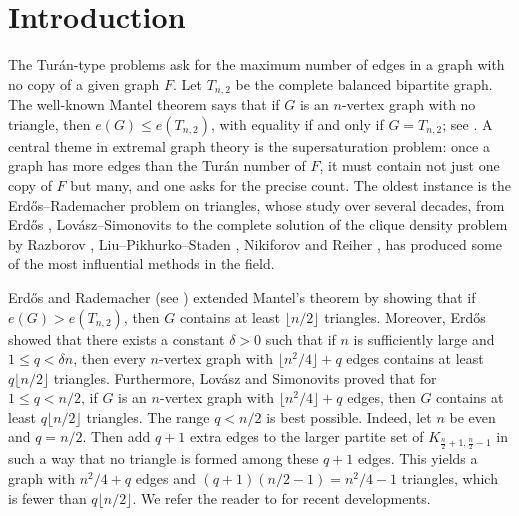 \documentclass[11pt,a4paper]{article}
\theoremstyle{definition}
\theoremstyle{plain}
\renewcommand{\le}{\leqslant}
\begin{document}
\section{Introduction}


The Tur\'an-type problems ask for the maximum number of edges in a graph with no copy of a given graph $F$. 
 Let $T_{n,2}$ be the complete balanced bipartite graph.  
The well-known Mantel theorem says that if $G$ is an $n$-vertex graph with no triangle, then $e(G)\le e(T_{n,2})$, with equality if and only if $G=T_{n,2}$; see \cite{Bollobas78}.   
A central theme in extremal graph theory is the
supersaturation problem: once a graph has more edges than
the Tur\'an number of $F$, it must contain not just
one copy of $F$ but many, and one asks for the
precise count. The oldest instance is the
Erd\H{o}s--Rademacher problem on triangles, whose
study over several decades, from Erd\H{o}s
\cite{Erd1962a, Erdos1964}, Lov\'{a}sz--Simonovits \cite{LS1975, LS1983} to the complete solution of the
clique density problem by Razborov \cite{Raz2008}, 
Liu--Pikhurko--Staden \cite{LPS2020}, 
 Nikiforov \cite{Nik2011} and
Reiher \cite{Rei2016}, has produced some of the most influential
methods in the field.


Erd\H{o}s and Rademacher (see \cite{Erd1962a, Erdos1964}) extended Mantel's theorem by showing that  
if $e(G)> e(T_{n,2}) $, 
then $G$ contains at least $ \lfloor {n}/{2}\rfloor$ triangles.   
Moreover, 
Erd\H{o}s \cite{Erd1962a}
 showed that there exists a constant $\delta>0$ such that if  $n$ is sufficiently large and $1\le q<\delta n$, then every $n$-vertex graph with $\lfloor n^2/4\rfloor +q$
 edges  contains at least $q\lfloor {n}/{2}\rfloor$ triangles. 
Furthermore, 
Lov\'{a}sz and Simonovits \cite{LS1975} proved that for $1\le q < {n}/{2}$, if $G$ is an $n$-vertex graph with 
$\lfloor {n^2}/{4} \rfloor + q$ edges,   
then $G$ contains at least $q \lfloor {n}/{2}\rfloor$ 
triangles. 
The range $q <n/2$ is best possible.  Indeed, let $n$ be even and $q = {n}/{2}$. Then add $q+1$ extra edges 
to the larger partite set of $K_{\frac{n}{2}+1, \frac{n}{2}-1}$ in such a way that no triangle is formed 
among these $q+1$ edges.  
This yields a graph with ${n^2}/{4} + q$ edges and $(q+1)({n}/{2} -1) = 
{n^2}/{4} -1$ triangles, which is fewer than $q \lfloor {n}/{2}\rfloor$.  
We refer the reader to 
\cite{XK2021,LM2022-Erd-Rad,BC2023, MY2023} for recent developments. 
\end{document}

